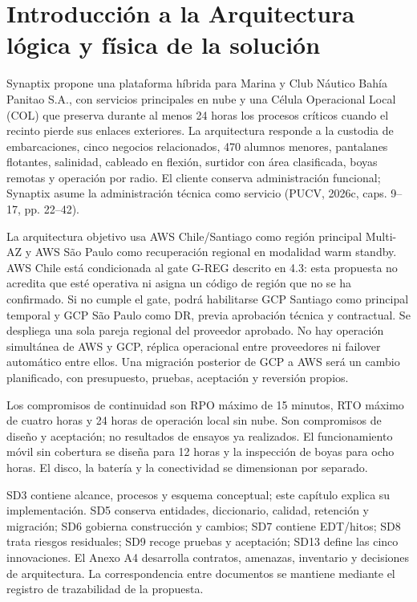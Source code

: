 \documentclass[11pt,letterpaper]{report}
\begin{document}
\tableofcontents
\clearpage
\setcounter{chapter}{3}
\chapter{Introducción a la Arquitectura lógica y física de la solución}
Synaptix propone una plataforma híbrida para Marina y Club Náutico Bahía Panitao S.A., con servicios principales en nube y una Célula Operacional Local (COL) que preserva durante al menos 24 horas los procesos críticos cuando el recinto pierde sus enlaces exteriores. La arquitectura responde a la custodia de embarcaciones, cinco negocios relacionados, 470 alumnos menores, pantalanes flotantes, salinidad, cableado en flexión, surtidor con área clasificada, boyas remotas y operación por radio. El cliente conserva administración funcional; Synaptix asume la administración técnica como servicio (PUCV, 2026c, caps. 9--17, pp. 22--42).

La arquitectura objetivo usa AWS Chile/Santiago como región principal Multi-AZ y AWS São Paulo como recuperación regional en modalidad warm standby. AWS Chile está condicionada al gate G-REG descrito en 4.3: esta propuesta no acredita que esté operativa ni asigna un código de región que no se ha confirmado. Si no cumple el gate, podrá habilitarse GCP Santiago como principal temporal y GCP São Paulo como DR, previa aprobación técnica y contractual. Se despliega una sola pareja regional del proveedor aprobado. No hay operación simultánea de AWS y GCP, réplica operacional entre proveedores ni failover automático entre ellos. Una migración posterior de GCP a AWS será un cambio planificado, con presupuesto, pruebas, aceptación y reversión propios.

Los compromisos de continuidad son RPO máximo de 15 minutos, RTO máximo de cuatro horas y 24 horas de operación local sin nube. Son compromisos de diseño y aceptación; no resultados de ensayos ya realizados. El funcionamiento móvil sin cobertura se diseña para 12 horas y la inspección de boyas para ocho horas. El disco, la batería y la conectividad se dimensionan por separado.

SD3 contiene alcance, procesos y esquema conceptual; este capítulo explica su implementación. SD5 conserva entidades, diccionario, calidad, retención y migración; SD6 gobierna construcción y cambios; SD7 contiene EDT/hitos; SD8 trata riesgos residuales; SD9 recoge pruebas y aceptación; SD13 define las cinco innovaciones. El Anexo A4 desarrolla contratos, amenazas, inventario y decisiones de arquitectura. La correspondencia entre documentos se mantiene mediante el registro de trazabilidad de la propuesta.
\end{document}
